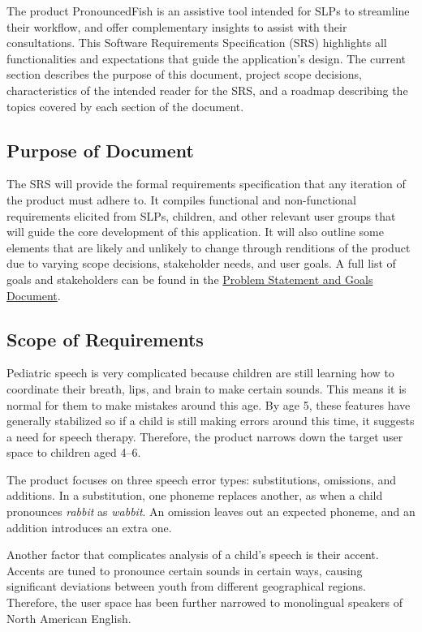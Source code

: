 \documentclass[12pt]{article}
\begin{document}
The product PronouncedFish is an assistive tool intended for SLPs to streamline their workflow, and offer complementary insights to assist with their consultations. This Software Requirements Specification (SRS) highlights all functionalities and expectations that guide the application’s design. The current section describes the purpose of this document, project scope decisions, characteristics of the intended reader for the SRS, and a roadmap describing the topics covered by each section of the document.

\subsection{Purpose of Document}
The SRS will provide the formal requirements specification that any iteration of the product must adhere to. It compiles functional and non-functional requirements elicited from SLPs, children, and other relevant user groups that will guide the core development of this application. It will also outline some elements that are likely and unlikely to change through renditions of the product due to varying scope decisions, stakeholder needs, and user goals. A full list of goals and stakeholders can be found in the \href{https://github.com/lilyporter/Ghoti/blob/main/pdfs/ProblemStatementAndGoals/ProblemStatement.pdf}{Problem Statement and Goals Document}.

\subsection{Scope of Requirements} 

Pediatric speech is very complicated because children are still learning how to coordinate their breath, lips, and brain to make certain sounds. This means it is normal for them to make mistakes around this age. By age 5, these features have generally stabilized so if a child is still making errors around this time, it suggests a need for speech therapy. Therefore, the product narrows down the target user space to children aged 4--6.

The product focuses on three speech error types: substitutions, omissions,
and additions. In a substitution, one phoneme replaces another, as when a
child pronounces \textit{rabbit} as \textit{wabbit}. An omission leaves out
an expected phoneme, and an addition introduces an extra one.

Another factor that complicates analysis of a child's speech is their accent. Accents are tuned to pronounce certain sounds in certain ways, causing significant deviations between youth from different geographical regions. Therefore, the user space has been further narrowed to monolingual speakers of North American English.
\end{document}
